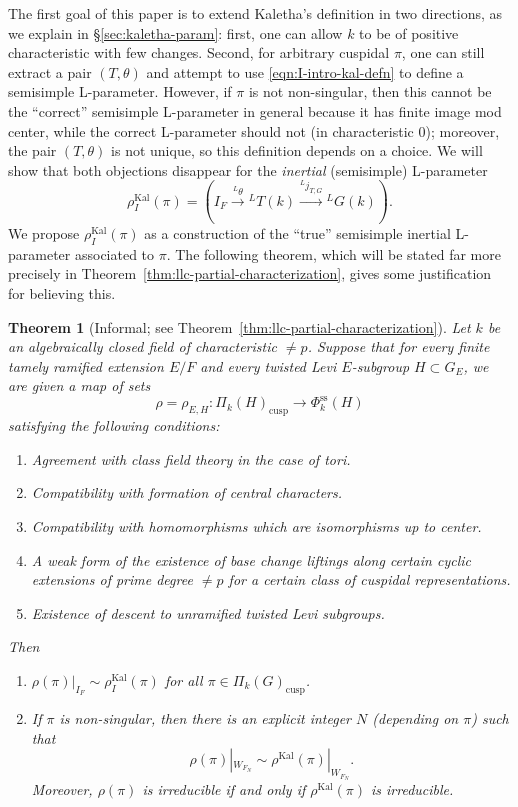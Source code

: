 \documentclass[reqno]{amsart}
\numberwithin{equation}{subsection}
\newcommand{\co}{\colon}
\newcommand{\ld}{{}^L}
\DeclareMathOperator{\Kal}{Kal}
\renewcommand{\ss}{\mathrm{ss}}
\newtheorem{thm}{Theorem}[subsection]
\theoremstyle{remark}
\numberwithin{equation}{subsection}
\numberwithin{figure}{subsection}
\begin{document}
The first goal of this paper is to extend Kaletha's definition in two directions, as we explain in \S\ref{sec:kaletha-param}: first, one can allow $k$ to be of positive characteristic with few changes. Second, for arbitrary cuspidal $\pi$, one can still extract a pair $(T, \theta)$ and attempt to use \eqref{eqn:I-intro-kal-defn} to define a semisimple L-parameter. However, if $\pi$ is not non-singular, then this cannot be the ``correct'' semisimple L-parameter in general because it has finite image mod center, while the correct L-parameter should not (in characteristic $0$); moreover, the pair $(T, \theta)$ is not unique, so this definition depends on a choice. We will show that both objections disappear for the \emph{inertial} (semisimple) L-parameter 
\[
\rho_I^{\Kal}(\pi) = \left(I_F \xrightarrow{\ld\theta} \ld T(k) \xrightarrow{\ld j_{T,G}} \ld G(k) \right).
\]
We propose $\rho_I^{\Kal}(\pi)$ as a construction of the ``true'' semisimple inertial L-parameter associated to $\pi$. The following theorem, which will be stated far more precisely in Theorem~\ref{thm:llc-partial-characterization}, gives some justification for believing this.


\begin{thm}[Informal; see Theorem~\ref{thm:llc-partial-characterization}]\label{thm:I-intro-llc-partial-characterization}
    Let $k$ be an algebraically closed field of characteristic $\neq p$. Suppose that for every finite tamely ramified extension $E/F$ and every twisted Levi $E$-subgroup $H \subset G_E$, we are given a map of sets
    \[
    \rho = \rho_{E,H}\co \Pi_k(H)_{\mathrm{cusp}} \to \Phi_k^{\ss}(H)
    \]
    satisfying the following conditions:
    \begin{enumerate}
        \item Agreement with class field theory in the case of tori.
        \item Compatibility with formation of central characters.
        \item Compatibility with homomorphisms which are isomorphisms up to center.
        \item A weak form of the existence of base change liftings along certain cyclic extensions of prime degree $\neq p$ for a certain class of cuspidal representations.
        \item Existence of descent to unramified twisted Levi subgroups.
    \end{enumerate}
    Then
    \begin{enumerate}[label=(\Alph*)]
        \item $\rho(\pi)|_{I_F} \sim \rho_I^{\Kal}(\pi)$ for all $\pi \in \Pi_k(G)_{\mathrm{cusp}}$.
        \item If $\pi$ is non-singular, then there is an explicit integer $N$ (depending on $\pi$) such that
        \begin{equation}\label{eqn:I-intro-restriction-to-finite-index}
        \rho(\pi)|_{W_{F_N}} \sim \rho^{\Kal}(\pi)|_{W_{F_N}}.
        \end{equation}
        Moreover, $\rho(\pi)$ is irreducible if and only if $\rho^{\Kal}(\pi)$ is irreducible.
    \end{enumerate}
\end{thm}
\end{document}

